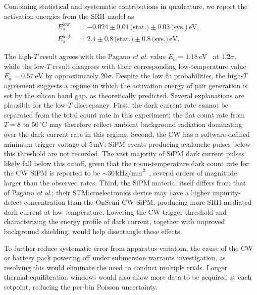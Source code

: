 \documentclass[aps,twocolumn,secnumarabic,balancelastpage,amsmath,amssymb,nofootinbib,floatfix]{revtex4-1}
\begin{document}
Combining statistical and systematic contributions in quadrature, we report the activation energies from the SRH model as
\begin{align}
    E_a^{\mathrm{low}}  &= -0.024 \pm 0.01\,\text{(stat.)} \pm 0.03\,\text{(sys.)}\,\mathrm{eV}, \label{eq:Ea_low}\\[2pt]
    E_a^{\mathrm{high}} &= 2.4 \pm 0.8\,\text{(stat.)} \pm 0.8\,\text{(sys.)}\,\mathrm{eV}. \label{eq:Ea_high}
\end{align}

The high-$T$ result agrees with the Pagano \emph{et al.} value $E_a = 1.18\,\text{eV}$~\cite{pagano2012} at $1.2\sigma$, while the low-$T$ result disagrees with their corresponding low-temperature value $E_a = 0.57\,\text{eV}$ by approximately $20\sigma$. Despite the low fit probabilities, the high-$T$ agreement suggests a regime in which the activation energy of pair generation is set by the silicon band gap, as theoretically predicted. Several explanations are plausible for the low-$T$ discrepancy. First, the dark current rate cannot be separated from the total count rate in this experiment; the flat count rate from $T = 8$ to $50\,^{\circ}\text{C}$ may therefore reflect ambient background radiation dominating over the dark current rate in this regime. Second, the CW has a software-defined minimum trigger voltage of $5$\,mV; SiPM events producing avalanche pulses below this threshold are not recorded. The vast majority of SiPM dark current pulses likely fall below this cutoff, given that the room-temperature dark count rate for the CW SiPM is reported to be $\sim 30\,\text{kHz/mm}^2$~\cite{cosmicwatch_manual}, several orders of magnitude larger than the observed rates. Third, the SiPM material itself differs from that of Pagano \emph{et al.}; their STMicroelectronics device may have a higher impurity-defect concentration than the OnSemi CW SiPM, producing more SRH-mediated dark current at low temperature. Lowering the CW trigger threshold and characterizing the energy profile of dark current, together with improved background shielding, would help disentangle these effects.

To further reduce systematic error from apparatus variation, the cause of the CW or battery pack powering off under submersion warrants investigation, as resolving this would eliminate the need to conduct multiple trials. Longer thermal-equilibration windows would also allow more data to be acquired at each setpoint, reducing the per-bin Poisson uncertainty.

\end{document}
